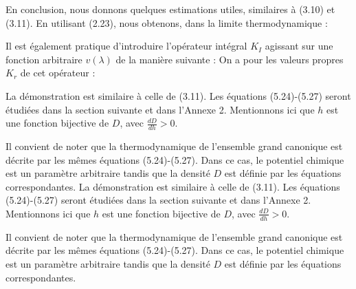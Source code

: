 En conclusion, nous donnons quelques estimations utiles, similaires à (3.10) et (3.11). En utilisant (2.23), nous obtenons, dans la limite thermodynamique :

Il est également pratique d'introduire l'opérateur intégral \( K_I \) agissant sur une fonction arbitraire \( v(\lambda) \) de la manière suivante :
On a pour les valeurs propres \( K_r \) de cet opérateur :

La démonstration est similaire à celle de (3.11). Les équations (5.24)-(5.27) seront étudiées dans la section suivante et dans l'Annexe 2. Mentionnons ici que \( h \) est une fonction bijective de \( D \), avec \( \frac{dD}{dh} > 0 \).

Il convient de noter que la thermodynamique de l'ensemble grand canonique est décrite par les mêmes équations (5.24)-(5.27). Dans ce cas, le potentiel chimique est un paramètre arbitraire tandis que la densité \( D \) est définie par les équations correspondantes.
La démonstration est similaire à celle de (3.11). Les équations (5.24)-(5.27) seront étudiées dans la section suivante et dans l'Annexe 2. Mentionnons ici que \( h \) est une fonction bijective de \( D \), avec \( \frac{dD}{dh} > 0 \).

Il convient de noter que la thermodynamique de l'ensemble grand canonique est décrite par les mêmes équations (5.24)-(5.27). Dans ce cas, le potentiel chimique est un paramètre arbitraire tandis que la densité \( D \) est définie par les équations correspondantes.







